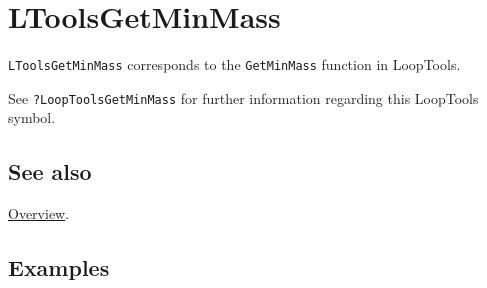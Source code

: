 \documentclass[../FeynHelpersManual.tex]{subfiles}
\begin{document}
\hypertarget{ltoolsgetminmass}{
\section{LToolsGetMinMass}\label{ltoolsgetminmass}}

\texttt{LToolsGetMinMass} corresponds to the \texttt{GetMinMass}
function in LoopTools.

See \texttt{?LoopTools\textasciigrave GetMinMass} for further
information regarding this LoopTools symbol.

\subsection{See also}

\hyperlink{toc}{Overview}.

\subsection{Examples}
\end{document}
